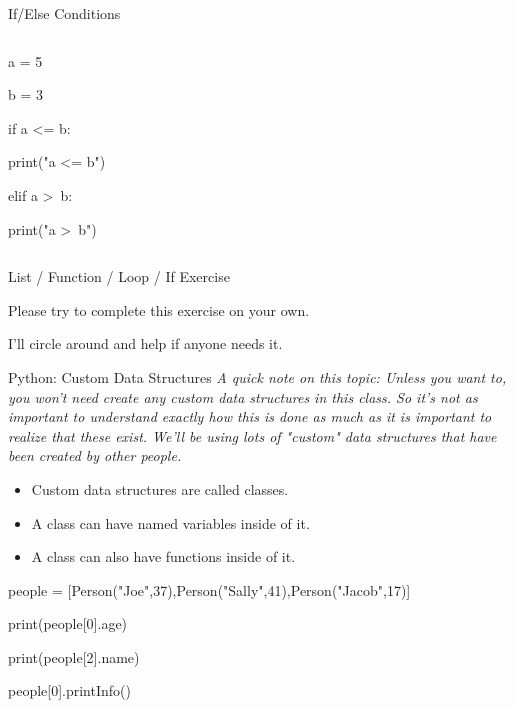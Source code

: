 \documentclass[10pt, aspectratio=169]{beamer}
\begin{document}
\begin{frame}[t]{If/Else Conditions}
\begin{columns}[t]
\begin{column}[t]{0.5\textwidth}
            \vspace{0.25cm}
            a = 5

            b = 3

            if a \textless= b:

                \hspace{0.25cm} print("a \textless= b")

            elif a \textgreater\ b:

                \hspace{0.25cm} print("a \textgreater\ b")

        \end{column}
    \end{columns}
\end{frame}

\begin{frame}{List / Function / Loop / If Exercise}
    \begin{center}
        Please try to complete this exercise on your own.

        I'll circle around and help if anyone needs it.
    \end{center}
\end{frame}

\begin{frame}{Python: Custom Data Structures}
    \textit{A quick note on this topic: Unless you want to, you won't need create any custom data structures in this class. So it's not as important to understand exactly how this is done as much as it is important to realize that these exist. We'll be using lots of "custom" data structures that have been created by other people.}
    \vspace{0.5cm}

    \begin{itemize}
        \item Custom data structures are called classes.
        \item A class can have named variables inside of it.
        \item A class can also have functions inside of it.
    \end{itemize}

    \vspace{0.5cm}

    people = [Person("Joe",37),Person("Sally",41),Person("Jacob",17)]

    \vspace{0.25cm}

    print(people[0].age)

    print(people[2].name)

    people[0].printInfo()
\end{frame}
\end{document}
